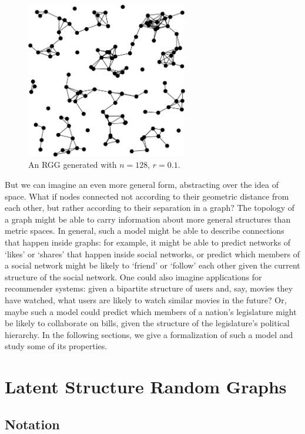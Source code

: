 \documentclass[12pt]{article}
\begin{document}
\begin{figure}[t]
\begin{center}
\includegraphics[width=200pt]{rgg}
\caption{An RGG generated with $n=128$, $r=0.1$.}
\end{center}
\end{figure} 

But we can imagine an even more general form, abstracting over the idea of
space. What if nodes connected not according to their geometric distance
from each other, but rather according to their separation in a graph? The
topology of a graph might be able to carry information about more general
structures than metric spaces. In general, such a model might be able to
describe connections that happen inside graphs: for example, it might be
able to predict networks of `likes' or `shares' that happen inside
social networks, or predict which members of a social network might
be likely to `friend' or `follow' each other given the current structure
of the social network. One could also imagine applications for recommender
systems: given a bipartite structure of users and, say, movies they have
watched, what users are likely to watch similar movies in the future?
Or, maybe such a model could predict which members of a nation's legislature
might be likely to collaborate on bills, given the structure of the legislature's
political hierarchy. In the following sections, we give a formalization
of such a model and study some of its properties.

\section{\textbf{\textsf{Latent Structure Random Graphs}}}

\subsection{\textbf{\textsf{Notation}}}
\end{document}
